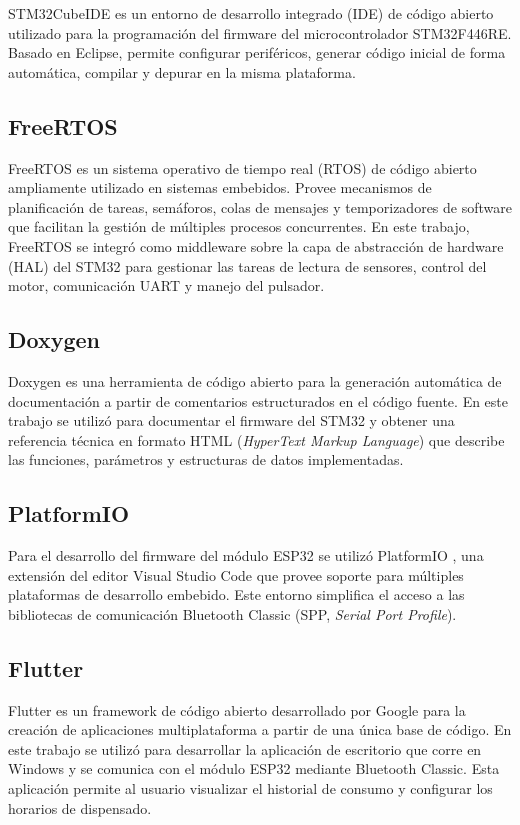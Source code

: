 STM32CubeIDE \cite{stm32cubeide} es un entorno de desarrollo integrado (IDE) de código abierto utilizado para la programación del firmware del microcontrolador STM32F446RE. Basado en Eclipse, permite configurar periféricos, generar código inicial de forma automática, compilar y depurar en la misma plataforma.

\subsection{FreeRTOS}

FreeRTOS es un sistema operativo de tiempo real (RTOS) de código abierto ampliamente utilizado en sistemas embebidos. Provee mecanismos de planificación de tareas, semáforos, colas de mensajes y temporizadores de software que facilitan la gestión de múltiples procesos concurrentes. En este trabajo, FreeRTOS se integró como middleware sobre la capa de abstracción de hardware (HAL) del STM32 para gestionar las tareas de lectura de sensores, control del motor, comunicación UART y manejo del pulsador.

\subsection{Doxygen}

Doxygen \cite{doxygen} es una herramienta de código abierto para la generación automática de documentación a partir de comentarios estructurados en el código fuente. En este trabajo se utilizó para 
documentar el firmware del STM32 y obtener una referencia técnica en formato HTML (\textit{HyperText Markup Language}) que describe las funciones, parámetros y estructuras de datos implementadas.

\subsection{PlatformIO}

Para el desarrollo del firmware del módulo ESP32 se utilizó PlatformIO \cite{platformio}, una extensión del editor Visual Studio Code que provee soporte para múltiples plataformas de desarrollo embebido. Este entorno simplifica el acceso a las bibliotecas de comunicación Bluetooth Classic (SPP, \textit{Serial Port Profile}).

\subsection{Flutter}
\label{sec:flutter}
Flutter \cite{flutter} es un framework de código abierto desarrollado por Google para la creación de aplicaciones multiplataforma a partir de una única base de código. En este trabajo se utilizó para desarrollar la aplicación de escritorio que corre en Windows y se comunica con el módulo ESP32 mediante Bluetooth Classic. Esta aplicación permite al usuario visualizar el historial de consumo y configurar los horarios de dispensado.

